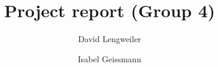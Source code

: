 \title{Project report (Group 4)} %
\author{David Lengweiler \and Isabel Geissmann} %

\institute{\lectureInstitute} %
\begin{report}









\end{report}

